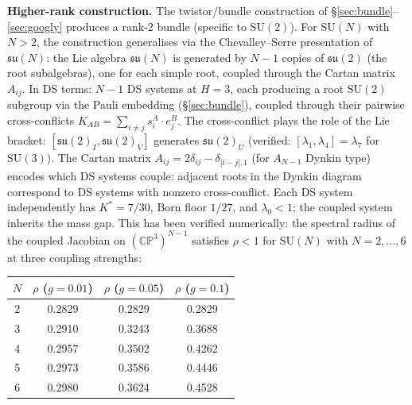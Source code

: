 \documentclass[11pt,a4paper]{article}
\theoremstyle{definition}
\theoremstyle{remark}
\newcommand{\CP}{\mathbb{CP}}
\newcommand{\SU}{\mathrm{SU}}
\newcommand{\su}{\mathfrak{su}}
\begin{document}
\textbf{Higher-rank construction.} The twistor/bundle construction of \S\ref{sec:bundle}--\ref{sec:googly} produces a rank-2 bundle (specific to $\SU(2)$). For $\SU(N)$ with $N>2$, the construction generalises via the Chevalley--Serre presentation of $\su(N)$: the Lie algebra $\su(N)$ is generated by $N-1$ copies of $\su(2)$ (the root subalgebras), one for each simple root, coupled through the Cartan matrix $A_{ij}$. In DS terms: $N-1$ DS systems at $H=3$, each producing a root $\SU(2)$ subgroup via the Pauli embedding (\S\ref{sec:bundle}), coupled through their pairwise cross-conflicts $K_{AB}=\sum_{i\neq j}s^A_i\cdot e^B_j$. The cross-conflict plays the role of the Lie bracket: $[\su(2)_I,\su(2)_V]$ generates $\su(2)_U$ (verified: $[\lambda_1,\lambda_4]=\lambda_7$ for $\SU(3)$). The Cartan matrix $A_{ij}=2\delta_{ij}-\delta_{|i-j|,1}$ (for $A_{N-1}$ Dynkin type) encodes which DS systems couple: adjacent roots in the Dynkin diagram correspond to DS systems with nonzero cross-conflict. Each DS system independently has $K^*=7/30$, Born floor $1/27$, and $\lambda_0<1$; the coupled system inherits the mass gap. This has been verified numerically: the spectral radius of the coupled Jacobian on $(\CP^3)^{N-1}$ satisfies $\rho<1$ for $\SU(N)$ with $N=2,\ldots,6$ at three coupling strengths:

\begin{center}
\begin{tabular}{cccc}
\toprule
$N$ & $\rho$ ($g=0.01$) & $\rho$ ($g=0.05$) & $\rho$ ($g=0.1$) \\
\midrule
2 & 0.2829 & 0.2829 & 0.2829 \\
3 & 0.2910 & 0.3243 & 0.3688 \\
4 & 0.2957 & 0.3502 & 0.4262 \\
5 & 0.2973 & 0.3586 & 0.4446 \\
6 & 0.2980 & 0.3624 & 0.4528 \\
\bottomrule
\end{tabular}
\end{center}
\end{document}
